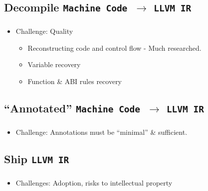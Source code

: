 \documentclass[mathserif,10pt]{beamer}
\newcommand{\cmt}[1]{}
\newcommand{\LIR}{{\tt LLVM IR}}
\newcommand{\MC}{{\tt Machine Code}}
\begin{document}
  \subsection{Decompile \MC \ $\rightarrow$ \LIR}
  \frame
  {
    \frametitle{\subsecname}
    \begin{itemize}
      \item Challenge: Quality     
      \begin{itemize}
        \item Reconstructing code and control flow - Much researched.
        \item Variable recovery
        \item Function \& ABI rules recovery
      \end{itemize}
    \end{itemize}

    \cmt{
        These methods make various trade-offs between ease of adoption, binary size,
        ease of shipping, and quality of the resulting LLVMIR, which directly
          affects the benefits that allvm provides.

          \item Diffrentiate data \& code.
          \item Indirect branch/call.
          \item Variable instruction size
          \item Position independent code (PIC) sequences
          \item Hand crafted assembly code
    }
  }


  \subsection{``Annotated'' \MC \ $\rightarrow$ \LIR}
  \frame
  {
    \frametitle{\subsecname}
    \begin{itemize}
      \item Challenge: Annotations must be ``minimal'' \& sufficient.
    \end{itemize}
  }

  \subsection{Ship \LIR}
  \frame
  {
    \frametitle{\subsecname}
    \begin{itemize}
      \item Challenges: Adoption, risks to intellectual property
    \end{itemize}
  }
\end{document}
